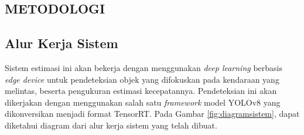 \begin{spacing}{1.2}
	\chapter{METODOLOGI}
	\label{sec:chap3_metodologi}
\end{spacing}

\vspace{4ex}

\section{Alur Kerja Sistem}
Sistem estimasi ini akan bekerja dengan menggunakan \emph{deep learning} berbasis \emph{edge device} untuk pendeteksian objek yang difokuskan pada kendaraan yang melintas, beserta pengukuran estimasi kecepatannya. Pendeteksian ini akan dikerjakan dengan menggunakan salah satu \emph{framework} model YOLOv8 yang dikonversikan menjadi format TensorRT. Pada Gambar \ref{fig:diagramsistem}, dapat diketahui diagram dari alur kerja sistem yang telah dibuat.

